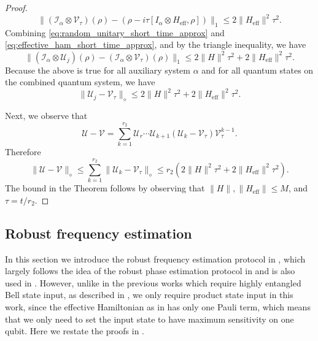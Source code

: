 \documentclass[twocolumn,superscriptaddress,aps,showpacs,amsmath,amstex,amssymb,citeautoscript,floatfix,pra,preprintnumbers]{revtex4-2}
\newcounter{alg}
\theoremstyle{plain}
\theoremstyle{plain}
\theoremstyle{plain}
\theoremstyle{plain}
\theoremstyle{plain}
\theoremstyle{plain}
\begin{document}
\begin{appendix}
\begin{proof}
\begin{equation}
    \label{eq:effective_ham_short_time_approx}
        \|(\mathcal{I}_\alpha\otimes \mathcal{V}_\tau)(\rho)-(\rho-i\tau [I_\alpha\otimes H_{\mathrm{eff}},\rho])\|_1\leq 2\|H_{\mathrm{eff}}\|^2\tau^2.
    \end{equation}
    Combining \eqref{eq:random_unitary_short_time_approx} and \eqref{eq:effective_ham_short_time_approx}, and by the triangle inequality, we have
    \begin{equation*}
        \|(\mathcal{I}_\alpha\otimes \mathcal{U}_j)(\rho)-(\mathcal{I}_\alpha\otimes \mathcal{V}_\tau)(\rho)\|_1\leq 2\|H\|^2\tau^2 + 2\|H_{\mathrm{eff}}\|^2\tau^2.
    \end{equation*}
    Because the above is true for all auxiliary system $\alpha$ and for all quantum states on the combined quantum system, we have
    \begin{equation}
        \|\mathcal{U}_j-\mathcal{V}_\tau\|_{\diamond}\leq 2\|H\|^2\tau^2 + 2\|H_{\mathrm{eff}}\|^2\tau^2.
    \end{equation}

    Next, we observe that
    \[
    \mathcal{U}-\mathcal{V} = \sum_{k=1}^{r_2} \mathcal{U}_r\cdots \mathcal{U}_{k+1}(\mathcal{U}_k-\mathcal{V}_\tau)\mathcal{V}_\tau^{k-1}.
    \]
    Therefore
    \[
    \|\mathcal{U}-\mathcal{V}\|_\diamond\leq \sum_{k=1}^{r_2} \|\mathcal{U}_k-\mathcal{V}_\tau\|_{\diamond}\leq r_2(2\|H\|^2\tau^2 + 2\|H_{\mathrm{eff}}\|^2\tau^2).
    \]
    The bound in the Theorem follows by observing that $\|H\|,\|H_{\mathrm{eff}}\|\leq M$, and $\tau = t/r_2$.
\end{proof}

\subsection{Robust frequency estimation}
\label{sec:robust_frequency_estimation_details}
In this section we introduce the robust frequency estimation protocol in \cite{LiTongNiGefenYing2023heisenberg}, which largely follows the idea of the robust phase estimation protocol in \cite{KimmelLowYoder2015robust} and is also used in \cite{ma2024learningkbodyhamiltonianscompressed}. However, unlike in the previous works which require highly entangled Bell state input, as described in , we only require product state input in this work, since the effective Hamiltonian as in  has only one Pauli term, which means that we only need to set the input state to have maximum sensitivity on one qubit. Here we restate the proofs in \cite{ma2024learningkbodyhamiltonianscompressed}.


\end{appendix}
\end{document}
